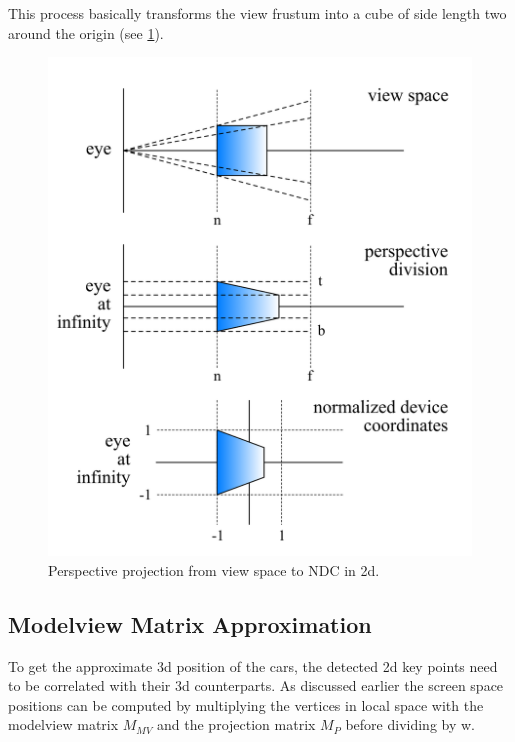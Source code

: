 \documentclass[conference]{IEEEtran}
\begin{document}
This process basically transforms the view frustum into a cube of side length two around the origin (see \ref{img:view_to_ndc}).

\begin{figure}[H]
    \centering
    \includegraphics[width=0.8\columnwidth]{./images/view_coordinates_to_ndc.png}
    \caption{Perspective projection from view space to NDC in 2d.}
    \label{img:view_to_ndc}
\end{figure}

\subsection{Modelview Matrix Approximation}

To get the approximate 3d position of the cars, the detected 2d key points need to be correlated with their 3d counterparts. As discussed earlier the screen space positions can be computed by multiplying the vertices in local space with the modelview matrix $M_{MV}$ and the projection matrix $M_P$ before dividing by w.
\end{document}
